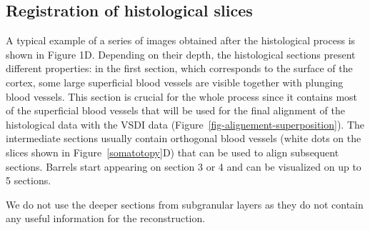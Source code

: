 \subsection{Registration of histological slices}
\label{sec-previous-works}


A typical example of a series of images obtained after the histological process is shown in Figure 1D. Depending on their depth, the histological sections present different properties: in the first section, which corresponds to the surface of the cortex, some large superficial blood vessels are visible together with plunging blood vessels. 
%
This section is crucial for the whole process since it contains most of the superficial blood vessels that will be used for the final alignment of the histological data with the VSDI data (Figure~\ref{fig-alignement-superposition}). The intermediate sections usually contain orthogonal blood vessels (white dots on the slices shown in Figure~\ref{somatotopy}D) that can be used to align subsequent sections. Barrels start appearing on section 3 or 4 and can be visualized on up to 5 sections.

We do not use the deeper sections from subgranular layers as they do not contain any useful information for the reconstruction.




